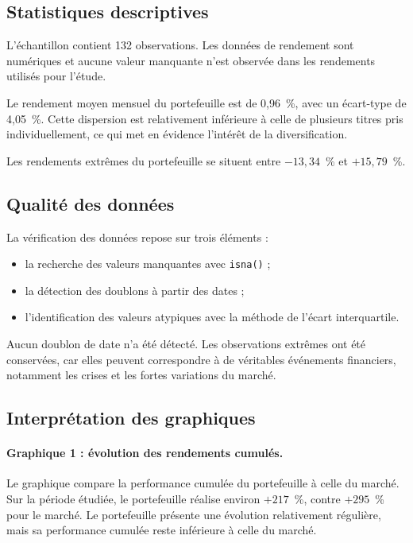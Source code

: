 \documentclass[12pt,a4paper]{article}
\begin{document}
\subsection{Statistiques descriptives}

L'échantillon contient 132 observations. Les données de rendement sont numériques et aucune valeur manquante n'est observée dans les rendements utilisés pour l'étude.

Le rendement moyen mensuel du portefeuille est de 0,96~\%, avec un écart-type de 4,05~\%. Cette dispersion est relativement inférieure à celle de plusieurs titres pris individuellement, ce qui met en évidence l'intérêt de la diversification.

Les rendements extrêmes du portefeuille se situent entre $-13{,}34$~\% et $+15{,}79$~\%.

\subsection{Qualité des données}

La vérification des données repose sur trois éléments :
\begin{itemize}
    \item la recherche des valeurs manquantes avec \texttt{isna()} ;
    \item la détection des doublons à partir des dates ;
    \item l'identification des valeurs atypiques avec la méthode de l'écart interquartile.
\end{itemize}

Aucun doublon de date n'a été détecté. Les observations extrêmes ont été conservées, car elles peuvent correspondre à de véritables événements financiers, notamment les crises et les fortes variations du marché.

\subsection{Interprétation des graphiques}

\paragraph{Graphique 1 : évolution des rendements cumulés.}
Le graphique compare la performance cumulée du portefeuille à celle du marché. Sur la période étudiée, le portefeuille réalise environ $+217$~\%, contre $+295$~\% pour le marché. Le portefeuille présente une évolution relativement régulière, mais sa performance cumulée reste inférieure à celle du marché.
\end{document}
